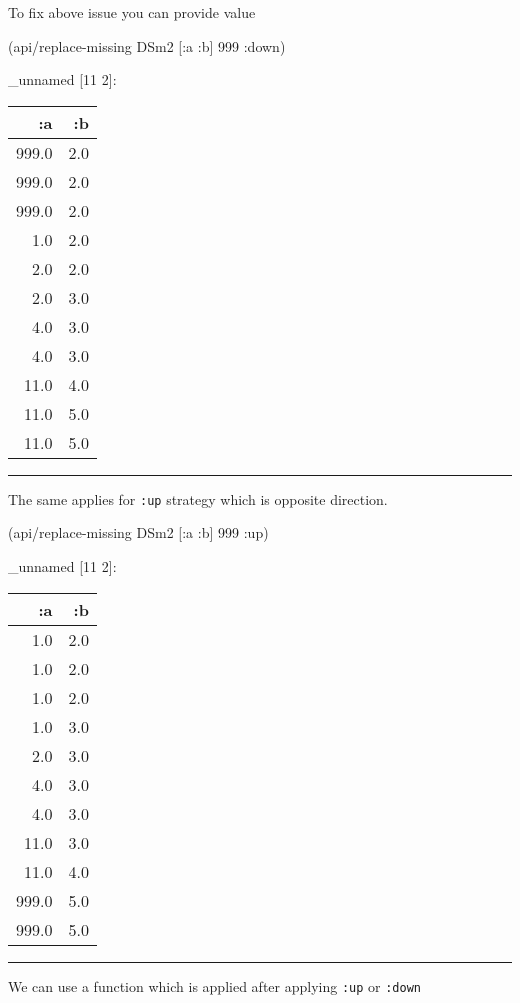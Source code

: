 \documentclass[]{article}
\newenvironment{Shaded}{\begin{snugshade}}{\end{snugshade}}
\newcommand{\DecValTok}[1]{\textcolor[rgb]{0.00,0.00,0.81}{#1}}
\newcommand{\AttributeTok}[1]{\textcolor[rgb]{0.77,0.63,0.00}{#1}}
\newcommand{\NormalTok}[1]{#1}
\begin{document}
To fix above issue you can provide value

\begin{Shaded}
\begin{Highlighting}[]
\NormalTok{(api/replace-missing DSm2 [}\AttributeTok{:a} \AttributeTok{:b}\NormalTok{] }\DecValTok{999} \AttributeTok{:down}\NormalTok{)}
\end{Highlighting}
\end{Shaded}

\_unnamed {[}11 2{]}:

\begin{longtable}[]{@{}rr@{}}
\toprule
:a & :b\tabularnewline
\midrule
\endhead
999.0 & 2.0\tabularnewline
999.0 & 2.0\tabularnewline
999.0 & 2.0\tabularnewline
1.0 & 2.0\tabularnewline
2.0 & 2.0\tabularnewline
2.0 & 3.0\tabularnewline
4.0 & 3.0\tabularnewline
4.0 & 3.0\tabularnewline
11.0 & 4.0\tabularnewline
11.0 & 5.0\tabularnewline
11.0 & 5.0\tabularnewline
\bottomrule
\end{longtable}

\begin{center}\rule{0.5\linewidth}{0.5pt}\end{center}

The same applies for \texttt{:up} strategy which is opposite direction.

\begin{Shaded}
\begin{Highlighting}[]
\NormalTok{(api/replace-missing DSm2 [}\AttributeTok{:a} \AttributeTok{:b}\NormalTok{] }\DecValTok{999} \AttributeTok{:up}\NormalTok{)}
\end{Highlighting}
\end{Shaded}

\_unnamed {[}11 2{]}:

\begin{longtable}[]{@{}rr@{}}
\toprule
:a & :b\tabularnewline
\midrule
\endhead
1.0 & 2.0\tabularnewline
1.0 & 2.0\tabularnewline
1.0 & 2.0\tabularnewline
1.0 & 3.0\tabularnewline
2.0 & 3.0\tabularnewline
4.0 & 3.0\tabularnewline
4.0 & 3.0\tabularnewline
11.0 & 3.0\tabularnewline
11.0 & 4.0\tabularnewline
999.0 & 5.0\tabularnewline
999.0 & 5.0\tabularnewline
\bottomrule
\end{longtable}

\begin{center}\rule{0.5\linewidth}{0.5pt}\end{center}

We can use a function which is applied after applying \texttt{:up} or
\texttt{:down}
\end{document}
